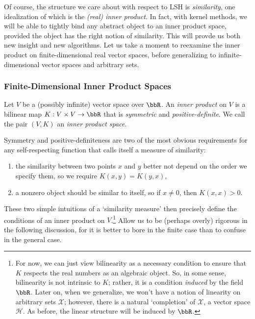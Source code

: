 \documentclass[twoside,11pt]{homework}
\begin{document}
Of course, the structure we care about with respect to LSH is \emph{similarity}, one idealization of which is the \emph{(real) inner product}. In fact, with kernel methods, we will be able to tightly bind any abstract object to an inner product space, provided the object has the right notion of similarity. This will provde us both new insight and new algorithms. Let us take a moment to reexamine the inner product on finite-dimensional real vector spaces, before generalizing to infinite-dimensional vector spaces and arbitrary sets.

\subsubsection{Finite-Dimensional Inner Product Spaces}
\begin{definition}\label{IP}
  Let $V$ be a (possibly infinite) vector space over $\bbR$. An \emph{inner product} on $V$ is a bilinear map $K : V \times V \to \bbR$
  that is \emph{symmetric} and \emph{positive-definite}. We call the pair $(V,K)$ an \emph{inner product space}.
\end{definition}
Symmetry and positive-definiteness are two of the most obvious requirements for any self-respecting function that calls itself a measure of similarity:
\begin{enumerate}
\item  the similarity between two points $x$ and $y$ better not depend on the order we specify them, so we require $K(x,y) = K(y,x)$,
\item a nonzero object should be similar to itself, so if $x \ne 0$, then $K(x,x) > 0$.
\end{enumerate}
These two simple intuitions of a `similarity measure' then precisely define the conditions of an inner product on $V$.\footnote{For now, we can just view bilinearity as a necessary condition to ensure that $K$ respects the real numbers as an algebraic object. So, in some sense, bilinearity is not intrinsic to $K$; rather, it is a condition \emph{induced} by the field $\bbR$. Later on, when we generalize, we won't have a notion of linearity on arbitrary sets $\mathcal{X}$; however, there is a natural `completion' of $\mathcal{X}$, a vector space $\mathcal{H}$. As before, the linear structure will be induced by $\bbR$.} Allow us to be (perhaps overly) rigorous in the following discussion, for it is better to bore in the finite case than to confuse in the general case.
\end{document}
